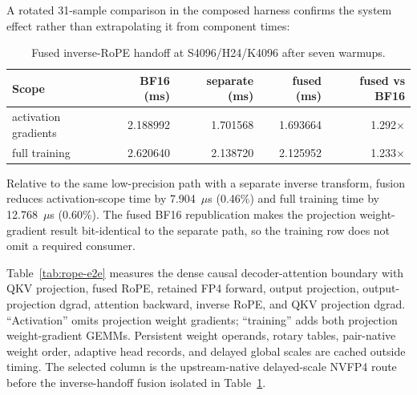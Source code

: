 A rotated 31-sample comparison in the composed harness confirms the system
effect rather than extrapolating it from component times:

\begin{table}[htbp]
\centering
\caption{Fused inverse-RoPE handoff at S4096/H24/K4096 after seven warmups.}
\label{tab:inverse-rope-e2e-ab}
\small
\begin{tabular}{l rrrr}
\toprule
Scope & BF16 (ms) & separate (ms) & fused (ms) & fused vs BF16 \\
\midrule
activation gradients & 2.188992 & 1.701568 & 1.693664 & 1.292$\times$ \\
full training & 2.620640 & 2.138720 & 2.125952 & 1.233$\times$ \\
\bottomrule
\end{tabular}
\end{table}

Relative to the same low-precision path with a separate inverse transform,
fusion reduces activation-scope time by 7.904~$\mu$s (0.46\%) and full
training time by 12.768~$\mu$s (0.60\%).  The fused BF16 republication makes
the projection weight-gradient result bit-identical to the separate path, so
the training row does not omit a required consumer.

Table~\ref{tab:rope-e2e} measures the dense causal decoder-attention boundary
with QKV projection, fused RoPE, retained FP4 forward, output projection,
output-projection dgrad, attention backward, inverse RoPE, and QKV projection
dgrad.  ``Activation'' omits projection weight gradients; ``training'' adds
both projection weight-gradient GEMMs.  Persistent weight operands, rotary
tables, pair-native weight order, adaptive head records, and delayed global
scales are cached outside timing.  The selected column is the upstream-native
delayed-scale NVFP4 route before the inverse-handoff fusion isolated in
Table~\ref{tab:inverse-rope-e2e-ab}.

